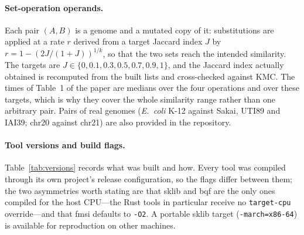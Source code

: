 \documentclass[runningheads,a4paper]{llncs}
\newcommand{\sklib}{\textsf{sklib}\xspace}
\newcommand{\kmc}{\textsf{KMC}\xspace}
\newcommand{\fmsi}{\textsf{fmsi}\xspace}
\newcommand{\bqf}{\textsf{bqf}\xspace}
\newif\ifrevmarkup\revmarkupfalse
\newenvironment{revblock}{\ifrevmarkup\color{blue}\fi}{}
\begin{document}
\begin{revblock}
\paragraph{Set-operation operands.}
Each pair $(A,B)$ is a genome and a mutated copy of it: substitutions are applied at a rate $r$ derived from a target Jaccard index $J$ by $r = 1-\left(2J/(1+J)\right)^{1/k}$, so that the two sets reach the intended similarity. The targets are $J\in\{0,0.1,0.3,0.5,0.7,0.9,1\}$, and the Jaccard index actually obtained is recomputed from the built lists and cross-checked against \kmc{}. The times of Table~1 of the paper are medians over the four operations and over these targets, which is why they cover the whole similarity range rather than one arbitrary pair. Pairs of real genomes (\emph{E.~coli} K-12 against Sakai, UTI89 and IAI39; chr20 against chr21) are also provided in the repository.

\paragraph{Tool versions and build flags.}
Table~\ref{tab:versions} records what was built and how. Every tool was compiled through its own project's release configuration, so the flags differ between them; the two asymmetries worth stating are that \sklib{} and \bqf{} are the only ones compiled for the host CPU---the Rust tools in particular receive no \texttt{target-cpu} override---and that \fmsi{} defaults to \texttt{-O2}. A portable \sklib{} target (\texttt{-march=x86-64}) is available for reproduction on other machines.


\end{revblock}
\end{document}
